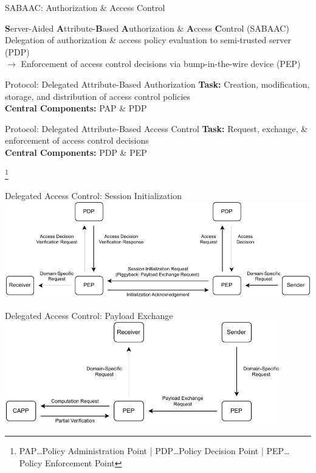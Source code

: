 \documentclass[en]{sdqbeamer}
\newcommand\nonumberfootnote[1]{%
  \begingroup
  \renewcommand\thefootnote{}\footnote{#1}%
  \addtocounter{footnote}{-1}%
  \endgroup
}
\begin{document}
\begin{frame}{SABAAC: Authorization \& Access Control}
    \begin{greenblock}{\textbf{S}erver-Aided \textbf{A}ttribute-\textbf{B}ased \textbf{A}uthorization \& \textbf{A}ccess \textbf{C}ontrol (SABAAC)}
        Delegation of authorization \& access policy evaluation to semi-trusted server (PDP)
        \\$\rightarrow$ Enforcement of access control decisions via bump-in-the-wire device (PEP)
    \end{greenblock}
    \begin{blueblock}{Protocol: Delegated Attribute-Based Authorization}
        \textbf{Task:} Creation, modification, storage, and distribution of access control policies
        \\\textbf{Central Components:} PAP \& PDP
    \end{blueblock}
    \begin{blueblock}{Protocol: Delegated Attribute-Based Access Control}
        \textbf{Task:} Request, exchange, \& enforcement of access control decisions
        \\\textbf{Central Components:} PDP \& PEP
    \end{blueblock}
    \nonumberfootnote{PAP\dots Policy Administration Point | PDP\dots Policy Decision Point | PEP\dots Policy Enforcement Point}
\end{frame}
\begin{frame}{Delegated Access Control: Session Initialization}
    \centering
    \includegraphics[width=1.0\textwidth]{./figures/SABAAC_protocols_accesscontrol_initialization_shortened.drawio.pdf}
\end{frame}
\begin{frame}{Delegated Access Control: Payload Exchange}
    \centering
    \includegraphics[width=0.90\textwidth]{./figures/SABAAC_protocols_accesscontrol_payloadexchange.drawio.pdf}
\end{frame}
\end{document}
